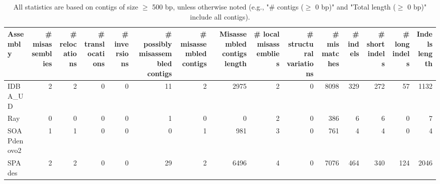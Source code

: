 \documentclass[12pt,a4paper]{article}
\begin{document}
\begin{table}[ht]
\begin{center}
\caption{All statistics are based on contigs of size $\geq$ 500 bp, unless otherwise noted (e.g., "\# contigs ($\geq$ 0 bp)" and "Total length ($\geq$ 0 bp)" include all contigs).}
\begin{tabular}{|l*{14}{|r}|}
\hline
Assembly & \# misassemblies &     \# relocations &     \# translocations &     \# inversions & \# possibly misassembled contigs & \# misassembled contigs & Misassembled contigs length & \# local misassemblies & \# structural variations & \# mismatches & \# indels &     \# short indels &     \# long indels & Indels length \\ \hline
IDBA\_UD & 2 & 2 & 0 & 0 & 11 & 2 & 2975 & 2 & 0 & 8098 & 329 & 272 & 57 & 1132 \\ \hline
Ray & 0 & 0 & 0 & 0 & 1 & 0 & 0 & 2 & 0 & 386 & 6 & 6 & 0 & 7 \\ \hline
SOAPdenovo2 & 1 & 1 & 0 & 0 & 0 & 1 & 981 & 3 & 0 & 761 & 4 & 4 & 0 & 4 \\ \hline
SPAdes & 2 & 2 & 0 & 0 & 29 & 2 & 6496 & 4 & 0 & 7076 & 464 & 340 & 124 & 2046 \\ \hline
\end{tabular}
\end{center}
\end{table}
\end{document}
